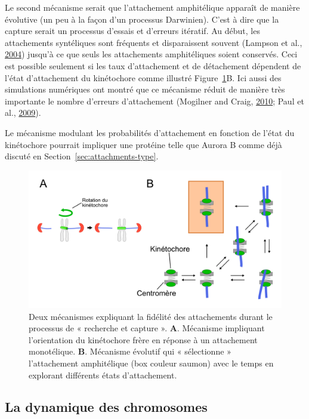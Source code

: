 \documentclass[12pt,a4paper,twoside,openright]{book}
\begin{document}
Le second mécanisme serait que l'attachement amphitélique apparaît de
manière évolutive (un peu à la façon d'un processus Darwinien). C'est à
dire que la capture serait un processus d'essais et d'erreurs itératif.
Au début, les attachements syntéliques sont fréquents et disparaissent
souvent (Lampson et al., \hyperref[ref-Lampson2004]{2004}) jusqu'à ce
que seuls les attachements amphitéliques soient conservés. Ceci est
possible seulement si les taux d'attachement et de détachement dépendent
de l'état d'attachement du kinétochore comme illustré
Figure~\ref{fig:spindle_assembly}B. Ici aussi des simulations numériques
ont montré que ce mécanisme réduit de manière très importante le nombre
d'erreurs d'attachement (Mogilner and Craig,
\hyperref[ref-Mogilner2010]{2010}; Paul et al.,
\hyperref[ref-Paul2009]{2009}).

Le mécanisme modulant les probabilités d'attachement en fonction de
l'état du kinétochore pourrait impliquer une protéine telle que Aurora B
comme déjà discuté en Section~\ref{sec:attachments-type}.

\begin{figure}[htbp]
\centering
\includegraphics{figures/intro/spindle_assembly.png}
\caption[Deux mécanismes de l'assemblage du fuseau mitotique]{\label{fig:spindle_assembly}Deux
mécanismes expliquant la fidélité des attachements durant le processus
de « recherche et capture ». \textbf{A}. Mécanisme impliquant
l'orientation du kinétochore frère en réponse à un attachement
monotélique. \textbf{B}. Mécanisme évolutif qui « sélectionne »
l'attachement amphitélique (box couleur saumon) avec le temps en
explorant différents états d'attachement.}
\end{figure}

\subsection{La dynamique des
chromosomes}\label{la-dynamique-des-chromosomes}
\end{document}

